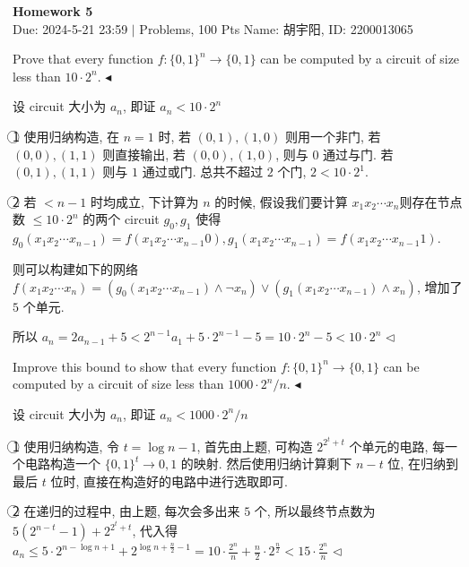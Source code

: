 \documentclass[11pt]{article}
\newenvironment{problem}[2][Problem]{\begin{trivlist}
		\item[\hskip \labelsep {\bfseries #1}\hskip \labelsep {\bfseries #2.}]}{\hfill$\blacktriangleleft$\end{trivlist}}
\newenvironment{answer}[1][Answer]{\begin{trivlist}
		\item[\hskip \labelsep {\bfseries #1.}\hskip \labelsep]}{\hfill$\lhd$\end{trivlist}}
\begin{document}
	\pagestyle{fancy}
	\chead{}
	\begin{center}
		{\LARGE \bf Homework 5}\\
		{Due: 2024-5-21 23:59 \quad$|$ Problems, 100 Pts}
		{Name: 胡宇阳, ID: 2200013065}
	\end{center}
	\begin{problem}{1.(16 points)}
		Prove that every function $f : \{0,1\}^n\rightarrow\{0,1\}$ can be computed by a circuit of size less than $10\cdot2^n$.
	\end{problem}
	\begin{answer}
		设 circuit 大小为 $a_n$, 即证 $a_n<10\cdot2^n$
		
		\textcircled{1} 使用归纳构造, 在 $n=1$ 时, 若 $(0,1),(1,0)$ 则用一个非门, 若 $(0,0),(1,1)$ 则直接输出, 若 $(0,0),(1,0)$, 则与 $0$ 通过与门. 若 $(0,1),(1,1)$ 则与 $1$ 通过或门. 总共不超过 $2$ 个门, $2<10\cdot2^1$.
		
		\textcircled{2} 若 $<n-1$ 时均成立, 下计算为 $n$ 的时候, 假设我们要计算 $x_1x_2\cdots x_n$则存在节点数 $\leq 10\cdot2^n$ 的两个 circuit $g_0,g_1$ 使得 $g_0(x_1x_2\cdots x_{n-1})=f(x_1x_2\cdots x_{n-1}0),g_1(x_1x_2\cdots x_{n-1})=f(x_1x_2\cdots x_{n-1}1)$.
		
		则可以构建如下的网络 $f(x_1x_2\cdots x_n)=(g_0(x_1x_2\cdots x_{n-1})\wedge\neg x_n)\vee(g_1(x_1x_2\cdots x_{n-1})\wedge x_n)$, 增加了 $5$ 个单元.
		
		所以 $a_n=2a_{n-1}+5<2^{n-1}a_1+5\cdot2^{n-1}-5=10\cdot2^n-5<10\cdot2^n$
	\end{answer}
	\begin{problem}{2.(21 points)}
		 Improve this bound to show that every function $f : \{0,1\}^n\rightarrow\{0,1\}$ can be computed by a circuit of size less than $1000\cdot2^n/n$.
	\end{problem}
	\begin{answer}
		设 circuit 大小为 $a_n$, 即证 $a_n<1000\cdot2^n/n$
		
		\textcircled{1} 使用归纳构造, 令 $t=\log n-1$, 首先由上题, 可构造 $2^{2^t+t}$ 个单元的电路, 每一个电路构造一个 $\{0,1\}^t\rightarrow{0,1}$ 的映射. 然后使用归纳计算剩下 $n-t$ 位, 在归纳到最后 $t$ 位时, 直接在构造好的电路中进行选取即可.
		
		\textcircled{2} 在递归的过程中, 由上题, 每次会多出来 $5$ 个, 所以最终节点数为 $5(2^{n-t}-1)+2^{2^t+t}$, 代入得 $a_n\leq 5\cdot2^{n-\log n+1}+2^{\log n+\frac{n}{2}-1}= 10\cdot\frac{2^n}{n}+\frac{n}{2}\cdot2^{\frac{n}{2}}<15\cdot\frac{2^n}{n}$
	\end{answer}
\end{document}

